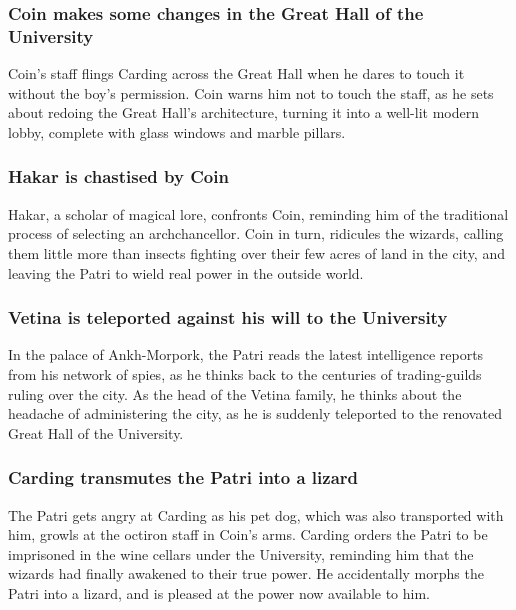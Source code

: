 \subsubsection{\Gls{Coin} makes some changes in the Great Hall of the University}
\Gls{Coin}'s staff flings \Gls{Carding} across the Great Hall when he dares to touch it without
the boy's permission. \Gls{Coin} warns him not to touch the staff, as he sets about redoing the
Great Hall's architecture, turning it into a well-lit modern lobby, complete with glass windows and
marble pillars.

\subsubsection{\Gls{Hakar} is chastised by \Gls{Coin}}
\Gls{Hakar}, a scholar of magical lore, confronts \Gls{Coin}, reminding him of the traditional
process of selecting an archchancellor. \Gls{Coin} in turn, ridicules the wizards, calling them
little more than insects fighting over their few acres of land in the city, and leaving the
\Gls{Patri} to wield real power in the outside world.

\subsubsection{\Gls{Vetina} is teleported against his will to the University}
In the palace of Ankh-Morpork, the \Gls{Patri} reads the latest intelligence reports from his
network of spies, as he thinks back to the centuries of trading-guilds ruling over the city.
As the head of the \Gls{Vetina} family, he thinks about the headache of administering the city,
as he is suddenly teleported to the renovated Great Hall of the University.

\subsubsection{\Gls{Carding} transmutes the \Gls{Patri} into a lizard}
The \Gls{Patri} gets angry at \Gls{Carding} as his pet dog, which was also transported with him,
growls at the octiron staff in \Gls{Coin}'s arms. \Gls{Carding} orders the \Gls{Patri} to be
imprisoned in the wine cellars under the University, reminding him that the wizards had finally
awakened to their true power. He accidentally morphs the \Gls{Patri} into a lizard, and is pleased
at the power now available to him.

\subsection{}
